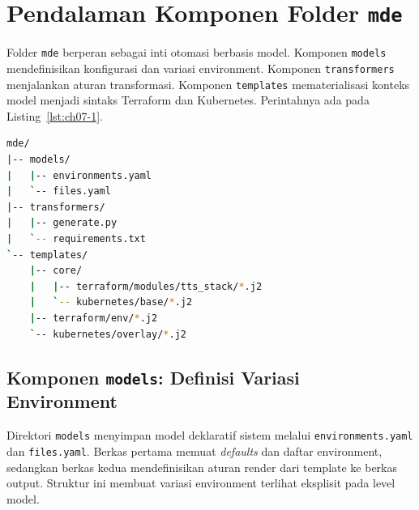 \section[Pendalaman Komponen Folder mdesec]{Pendalaman Komponen Folder \texttt{mde}}\label{sec:mde-komponen-folder}

Folder \texttt{mde} berperan sebagai inti otomasi berbasis model. Komponen \texttt{models} mendefinisikan konfigurasi dan variasi environment. Komponen \texttt{transformers} menjalankan aturan transformasi. Komponen \texttt{templates} mematerialisasi konteks model menjadi sintaks Terraform dan Kubernetes. Perintahnya ada pada Listing~\ref{lst:ch07-1}.

\begin{lstlisting}[language=bash,caption={Listing: Struktur komponen utama folder mde}, label={lst:ch07-1}]
mde/
|-- models/
|   |-- environments.yaml
|   `-- files.yaml
|-- transformers/
|   |-- generate.py
|   `-- requirements.txt
`-- templates/
    |-- core/
    |   |-- terraform/modules/tts_stack/*.j2
    |   `-- kubernetes/base/*.j2
    |-- terraform/env/*.j2
    `-- kubernetes/overlay/*.j2
\end{lstlisting}

\subsection[Komponen models]{Komponen \texttt{models}: Definisi Variasi Environment}\label{subsec:mde-models}

Direktori \texttt{models} menyimpan model deklaratif sistem melalui \texttt{environments.yaml} dan \texttt{files.yaml}. Berkas pertama memuat \textit{defaults} dan daftar environment, sedangkan berkas kedua mendefinisikan aturan render dari template ke berkas output. Struktur ini membuat variasi environment terlihat eksplisit pada level model.


